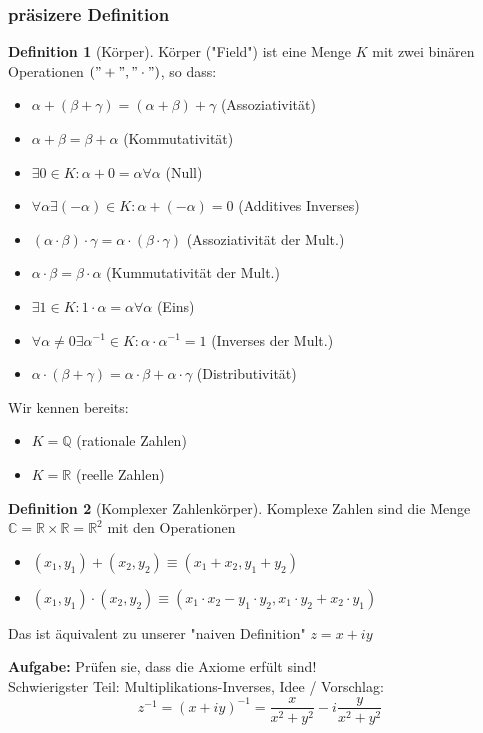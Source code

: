 \documentclass[a4paper]{scrartcl}
\DeclareMathOperator{\Exists}{\exists}
\DeclareMathOperator{\Forall}{\forall}
\theoremstyle{definition}
\newtheorem{defn}{Definition}
\theoremstyle{plain}
\theoremstyle{remark}
\newcommand{\I}{\ensuremath{i}}%
\begin{document}
\subsubsection{präsizere Definition}
\label{sec-5-1-3}
\begin{defn}[Körper]
Körper ("Field") ist eine Menge $K$ mit zwei binären Operationen $("+","\cdot")$, so dass:
\begin{itemize}
\item $\alpha + (\beta + \gamma) = (\alpha + \beta) + \gamma$ \hfill (Assoziativität)
\item $\alpha + \beta = \beta + \alpha$ \hfill (Kommutativität)
\item $\Exists 0 \in K: \alpha + 0 = \alpha \Forall \alpha$ \hfill (Null)
\item $\Forall \alpha \Exists (-\alpha) \in K: \alpha + (-\alpha) = 0$ \hfill (Additives Inverses)
\item $(\alpha \cdot \beta) \cdot \gamma = \alpha \cdot (\beta \cdot \gamma)$ \hfill (Assoziativität der Mult.)
\item $\alpha \cdot \beta = \beta \cdot \alpha$ \hfill (Kummutativität der Mult.)
\item $\Exists 1 \in K: 1\cdot \alpha = \alpha \Forall \alpha$ \hfill (Eins)
\item $\Forall \alpha \neq 0 \Exists \alpha^{-1} \in K: \alpha \cdot \alpha^{-1} = 1$ \hfill (Inverses der Mult.)
\item $\alpha\cdot (\beta + \gamma) = \alpha \cdot \beta + \alpha \cdot \gamma$ \hfill (Distributivität)
\end{itemize}
\end{defn}
Wir kennen bereits:
\begin{itemize}
\item $K = \mathbb{Q}$ \hfill (rationale Zahlen)
\item $K = \mathbb{R}$ \hfill (reelle Zahlen)
\end{itemize}
\begin{defn}[Komplexer Zahlenkörper]
Komplexe Zahlen sind die Menge $\mathbb{C} = \mathbb{R} \times \mathbb{R} = \mathbb{R}^2$ mit den Operationen
\begin{itemize}
\item $(x_1, y_1) + (x_2, y_2) \equiv (x_1 + x_2, y_1 + y_2)$
\item $(x_1, y_1) \cdot (x_2, y_2) \equiv (x_1 \cdot x_2 - y_1 \cdot y_2, x_1 \cdot y_2 + x_2 \cdot y_1)$
\end{itemize}
Das ist äquivalent zu unserer "naiven Definition" $z = x + \I y$
\end{defn}
\textbf{Aufgabe:} Prüfen sie, dass die Axiome erfült sind! \\
    Schwierigster Teil: Multiplikations-Inverses, Idee / Vorschlag:
\[z^{-1} = (x + \I y)^{-1} = \frac{x}{x^2 + y^2} - \I \frac{y}{x^2 + y^2}\]
\end{document}
